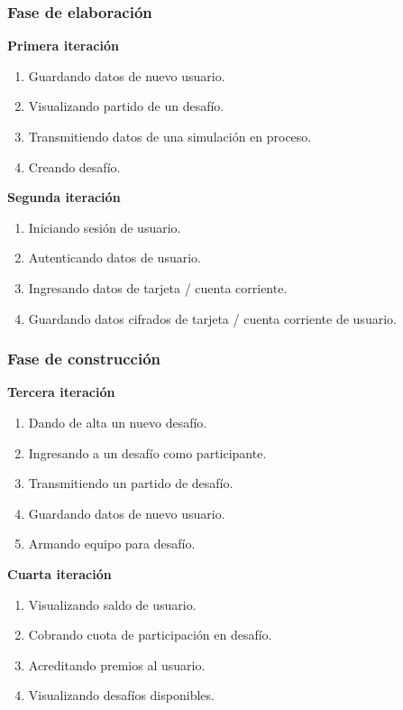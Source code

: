 \documentclass[a4paper, 10pt, twoside]{article}
\begin{document}
\subsubsection{Fase de elaboración}

\textbf{Primera iteración}
\begin{enumerate}
\item Guardando datos de nuevo usuario.
\item Visualizando partido de un desafío.
\item Transmitiendo datos de una simulación en proceso.
\item Creando desafío.
\end{enumerate}

\textbf{Segunda iteración}
\begin{enumerate}
\item Iniciando sesión de usuario.
\item Autenticando datos de usuario.
\item Ingresando datos de tarjeta / cuenta corriente.
\item Guardando datos cifrados de tarjeta / cuenta corriente de usuario.
\end{enumerate}

\subsubsection{Fase de construcción}

\textbf{Tercera iteración}
\begin{enumerate}
\item Dando de alta un nuevo desafío.
\item Ingresando a un desafío como participante.
\item Transmitiendo un partido de desafío.
\item Guardando datos de nuevo usuario.
\item Armando equipo para desafío.
\end{enumerate}

\textbf{Cuarta iteración}
\begin{enumerate}
\item Visualizando saldo de usuario.
\item Cobrando cuota de participación en desafío.
\item Acreditando premios al usuario.
\item Visualizando desafíos disponibles.
\end{enumerate}
\end{document}
